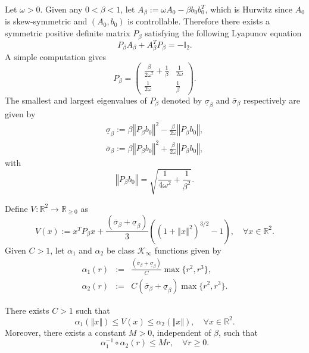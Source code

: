 \documentclass[letterpaper, 10pt]{article}
\newcommand{\identity}{\mathbb{I}}
\newcommand{\kk}{\mathcal{K}}
\newcommand{\norme}[1]{\left\Vert #1\right\Vert}
\newcommand{\reels}{\mathbb{R}}
\begin{document}
Let $\omega >0$. Given any $0 <\beta < 1$, let $A_{\beta} := \omega A_0 - \beta b_0 b_0^T $, which is Hurwitz since $A_0$ is skew-symmetric and $(A_0,b_0)$ is controllable. Therefore there exists a symmetric positive definite matrix $P_{\beta}$ satisfying the following Lyapunov equation 
\begin{equation}
\label{eq:lyap:osci}
P_{\beta} A_{\beta} + A_{\beta}^T P_{\beta} = -\identity_2.
\end{equation} A simple computation gives
\begin{equation*}
P_{\beta} = \begin{pmatrix}
\frac{\beta}{2 \omega^2}+ \frac{1}{\beta} & \frac{1}{2 \omega} \\
\frac{1}{2 \omega} & \frac{1 }{\beta}
\end{pmatrix}.
\end{equation*} 
The smallest and largest eigenvalues of $P_{\beta}$ denoted by $\underline{\sigma}_{\beta}$ and $\overline{\sigma}_{\beta}$ respectively are given by
\begin{eqnarray*}
\underline{\sigma}_{\beta} := \beta \norme{P_{\beta} b_0}^2 - \frac{\beta }{2 \omega } \norme{P_{\beta} b_0}, \\
\overline{\sigma}_{\beta}  := \beta \norme{P_{\beta} b_0}^2 + \frac{\beta }{2 \omega } \norme{P_{\beta} b_0},
\end{eqnarray*} with
\begin{equation*}
\norme{P_{\beta} b_0} = \sqrt{\frac{1}{4 \omega^2}+ \frac{1}{\beta^2}}.
\end{equation*}

Define $V_{ } : \reels^2 \to \reels_{\geq 0}$ as 
\begin{equation}
\label{Lyap_osci}
V (x):= x^T P_{\beta} x + \frac{ (\overline{\sigma}_{\beta} + \underline{\sigma}_{\beta} )  }{3} \left( (1 + \norme{x}^2 )^{3/2}  -1 \right), \quad \forall x \in \reels^2.
\end{equation} 
Given $C > 1$, let $\alpha_1$ and $\alpha_2$ be class $\kk_{\infty}$ functions given by
\begin{eqnarray*}
\alpha_{1}(r ) & :=  & \frac{(\overline{\sigma}_{\beta} + \underline{\sigma}_{\beta} ) }{C}  \max \lbrace r^2 , r^3 \rbrace , \\
\alpha_{2}(r ) & := & C (\overline{\sigma}_{\beta} + \underline{\sigma}_{\beta} )   \max \lbrace r^2 , r^3 \rbrace .
\end{eqnarray*} 

There exists $C>1$ such that
\begin{equation*}
\alpha_1(\norme{x}) \leq V(x) \leq \alpha_2(\norme{x}), \quad \forall x \in \reels^2 .
\end{equation*} Moreover, there exists a constant $M>0$, independent of $\beta$, such that 
\begin{equation}\label{assert:lyap:osci}
\alpha_1^{-1} \circ \alpha_2 (r) \leq M r, \quad  \forall r \geq 0.
\end{equation}
\end{document}
